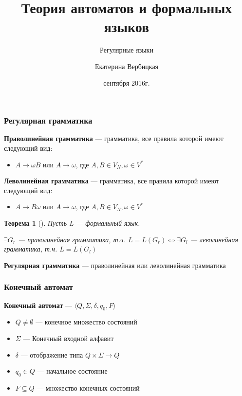 \documentclass{beamer}
\title[]{Теория автоматов и формальных языков}
\subtitle[]{Регулярные языки}
\institute[]{
Санкт-Петербургский государственный электротехнический университет <<ЛЭТИ>>\\
}
\author[]{Екатерина Вербицкая}
\date{ сентября 2016г.}
\newtheorem{rutheorem}{Теорема}
\begin{document}
{
  \begin{frame}
    \titlepage
  \end{frame}
}

\begin{frame}[fragile]
  \transwipe[direction=90]
  \frametitle{Регулярная грамматика}
  \textbf{Праволинейная грамматика} --- грамматика, все правила которой имеют следующий вид:
  \begin{itemize}
    \item $A \rightarrow \omega B$ или $A \rightarrow \omega$, где $A, B \in V_N, \omega \in V^*$
  \end{itemize}


  \textbf{Леволинейная грамматика} --- грамматика, все правила которой имеют следующий вид:
  \begin{itemize}
    \item $A \rightarrow B \omega$ или $A \rightarrow \omega$, где $A, B \in V_N, \omega \in V^*$
  \end{itemize}

\pause 

  \begin{rutheorem}[]
    Пусть L --- формальный язык. 

    $\exists G_r$ --- праволинейная грамматика, т.ч. $L = L(G_r) \Leftrightarrow \exists G_l$ --- леволинейная грамматика, т.ч. $L = L(G_l) $
  \end{rutheorem}
\pause
  \textbf{Регулярная грамматика} --- праволинейная или леволинейная грамматика
\end{frame}

\begin{frame}[fragile]
  \transwipe[direction=90]
  \frametitle{Конечный автомат}
  \textbf{Конечный автомат} --- $\langle Q, \Sigma, \delta, q_0, F \rangle$
  \begin{itemize}
    \item $Q \neq \emptyset$ --- конечное множество состояний
    \item $\Sigma$ --- Конечный входной алфавит
    \item $\delta$ --- отображение типа $Q \times \Sigma \rightarrow Q$
    \item $q_0 \in Q$ --- начальное состояние
    \item $F \subseteq Q$ --- множество конечных состояний
  \end{itemize}
\end{frame}
\end{document}
